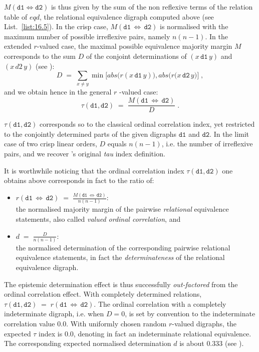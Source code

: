 $M(\mathtt{d1} \Leftrightarrow \mathtt{d2})$ is thus given by the sum of the non reflexive terms of the relation table of $eqd$, the relational equivalence digraph computed above (see List.~\vref{list:16.5}). In the crisp case, $M(\mathtt{d1}\,\Leftrightarrow\, \mathtt{d2})$  is normalised with the maximum number of possible irreflexive pairs, namely $n(n-1)$. In the extended $r$-valued case, the maximal possible equivalence majority margin $M$ corresponds to the sum $D$ of the conjoint determinations of $(x \,\mathtt{d1}\, y)$ and $(x \,d2\, y)$ (see \citealp{BIS-2012a}):
\begin{equation}
  D \;=\; \sum_{x \neq y} \min \Big[ abs\big(r(x \,\mathtt{d1}\, y) \big), abs \big( r(x \,\mathtt{d2}\, y \big)  \Big]\;,
\end{equation}
and we obtain hence in the general $r$ -valued case:
\begin{equation}\label{eq:16.4}
  \tau(\mathtt{d1},\mathtt{d2}) \;=\; \frac{M(\mathtt{d1}\,\Leftrightarrow\, \mathtt{d2})}{D}\;.
\end{equation}

$\tau(\mathtt{d1},\mathtt{d2})$ corresponds so to the classical ordinal correlation index, yet restricted to the conjointly determined parts of the given digraphs $\mathtt{d1}$ and $\mathtt{d2}$. In the limit case of two crisp linear orders, $D$ equals $n(n-1)$, i.e. the number of irreflexive pairs, and we recover \Kendall 's original \emph{tau} index definition.

It is worthwhile noticing that the ordinal correlation index $\tau(\mathtt{d1},\mathtt{d2})$ one obtains above corresponds in fact to the ratio of:
\begin{itemize}[topsep=2pt]
\item $r(\mathtt{d1}\,\Leftrightarrow\, \mathtt{d2}) \;=\; \frac{M(\mathtt{d1}\,\Leftrightarrow\, \mathtt{d2})}{n(n-1)}$:\\the normalised majority margin of the pairwise \emph{relational} equivalence statements, also called \emph{valued ordinal correlation}, and 
\item $d \;=\; \frac{D}{n(n-1)}$:\\ the normalised determination of the corresponding pairwise relational equivalence statements, in fact the \emph{determinateness} of the relational equivalence digraph.
\end{itemize}

The epistemic determination effect is thus successfully \emph{out-factored} from the ordinal correlation effect. With completely determined relations, $\tau(\mathtt{d1},\mathtt{d2}) \;=\; r(\mathtt{d1}\,\Leftrightarrow\, \mathtt{d2})$. The ordinal correlation with a completely indeterminate digraph, i.e. when $D = 0$, is set by convention to the indeterminate correlation value $0.0$. With uniformly chosen random $r$-valued digraphs, the expected $\tau$ index is $0.0$, denoting in fact an indeterminate relational equivalence. The corresponding expected normalised determination $d$ is about $0.333$ (see \citet{BIS-2012a}).

